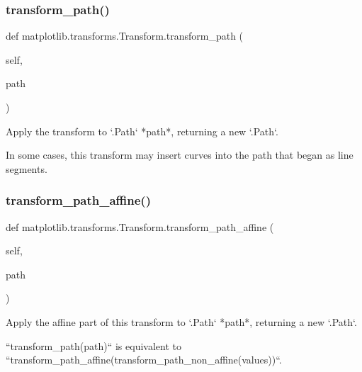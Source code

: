 \subsubsection{\texorpdfstring{transform\+\_\+path()}{transform\_path()}}
{\footnotesize\ttfamily def matplotlib.\+transforms.\+Transform.\+transform\+\_\+path (\begin{DoxyParamCaption}\item[{}]{self,  }\item[{}]{path }\end{DoxyParamCaption})}

\begin{DoxyVerb}Apply the transform to `.Path` *path*, returning a new `.Path`.

In some cases, this transform may insert curves into the path
that began as line segments.
\end{DoxyVerb}
 \mbox{\label{classmatplotlib_1_1transforms_1_1Transform_a53f9be50f7b90fd84dc10db6dcf5f9e6}} 
\subsubsection{\texorpdfstring{transform\+\_\+path\+\_\+affine()}{transform\_path\_affine()}}
{\footnotesize\ttfamily def matplotlib.\+transforms.\+Transform.\+transform\+\_\+path\+\_\+affine (\begin{DoxyParamCaption}\item[{}]{self,  }\item[{}]{path }\end{DoxyParamCaption})}

\begin{DoxyVerb}Apply the affine part of this transform to `.Path` *path*, returning a
new `.Path`.

``transform_path(path)`` is equivalent to
``transform_path_affine(transform_path_non_affine(values))``.
\end{DoxyVerb}
 \mbox{\label{classmatplotlib_1_1transforms_1_1Transform_a3f73b45bb73b28efddbbb8ff6f828c8d}} 
